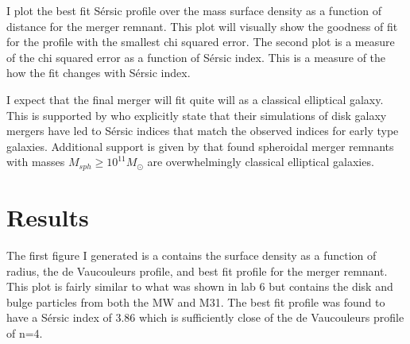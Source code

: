 \documentclass[fleqn,usenatbib]{mnras}
\begin{document}
I plot the best fit S\'ersic profile over the mass surface
density as a function of distance for the merger remnant. This plot will visually show the goodness of fit for the profile with the smallest chi squared error. The second plot is a measure of the chi squared error as a function of S\'ersic index. This is a measure of the how the fit changes with S\'ersic index.  


I expect that the final merger will fit quite will as a classical elliptical galaxy. This is supported by \citet{Aceves2006} who explicitly state that their simulations of disk galaxy mergers have led to S\'ersic indices that match the observed indices for early type galaxies. Additional support is given by \citet{Hopkins2008} that found spheroidal merger remnants with masses $M_{sph}\ge10^{11} M_{\odot}$ are overwhelmingly classical elliptical galaxies. 

\section{Results}

The first figure I generated is a contains the surface density as a function of radius, the de Vaucouleurs profile, and best fit profile for the merger remnant. This plot is fairly similar to what was shown in lab 6 but contains the disk and bulge particles from both the MW and M31. The best fit profile was found to have a S\'ersic index of 3.86 which is sufficiently close of the de Vaucouleurs profile of n=4. 
\end{document}

